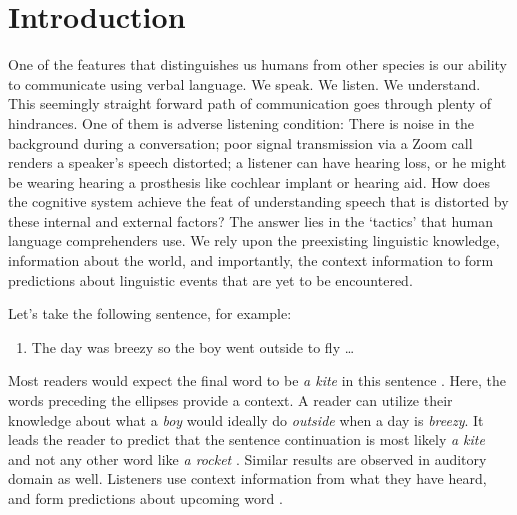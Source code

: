 \documentclass[a4paper, nobind]{templates/ociamthesis}
\providecommand{\tightlist}{%
  \setlength{\itemsep}{0pt}\setlength{\parskip}{0pt}}
\begin{document}
\flushbottom

\hypertarget{introduction}{%
\chapter{Introduction}\label{introduction}}

One of the features that distinguishes us humans from other species is our ability to communicate using verbal language.
We speak. We listen. We understand.
This seemingly straight forward path of communication goes through plenty of hindrances.
One of them is adverse listening condition:
There is noise in the background during a conversation;
poor signal transmission via a Zoom call renders a speaker's speech distorted;
a listener can have hearing loss, or he might be wearing hearing a prosthesis like cochlear implant or hearing aid.
How does the cognitive system achieve the feat of understanding speech that is distorted by these internal and external factors?
The answer lies in the `tactics' that human language comprehenders use.
We rely upon the preexisting linguistic knowledge, information about the world, and importantly, the context information to form predictions about linguistic events that are yet to be encountered.

Let's take the following sentence, for example:

\begin{enumerate}
\def\labelenumi{(\arabic{enumi})}
\tightlist
\item
  The day was breezy so the boy went outside to fly \ldots{}
\end{enumerate}

Most readers would expect the final word to be \emph{a kite} in this sentence \autocites{Delong2005}[cf.][]{Nieuwland2020a}.
Here, the words preceding the ellipses provide a context.
A reader can utilize their knowledge about what a \emph{boy} would ideally do \emph{outside} when a day is \emph{breezy}.
It leads the reader to predict that the sentence continuation is most likely \emph{a kite} and not any other word like \emph{a rocket} .
Similar results are observed in auditory domain as well.
Listeners use context information from what they have heard, and form predictions about upcoming word \autocites[e.g.,][]{Altmann2007,Ankener2019}.
\end{document}

